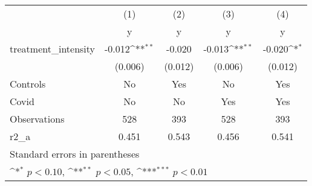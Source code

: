 {
\def\sym#1{\ifmmode^{#1}\else\(^{#1}\)\fi}
\begin{tabular}{l*{4}{c}}
\hline\hline
                    &\multicolumn{1}{c}{(1)}&\multicolumn{1}{c}{(2)}&\multicolumn{1}{c}{(3)}&\multicolumn{1}{c}{(4)}\\
                    &\multicolumn{1}{c}{y}&\multicolumn{1}{c}{y}&\multicolumn{1}{c}{y}&\multicolumn{1}{c}{y}\\
\hline
treatment\_intensity &      -0.012\sym{**} &      -0.020         &      -0.013\sym{**} &      -0.020\sym{*}  \\
                    &     (0.006)         &     (0.012)         &     (0.006)         &     (0.012)         \\
[1em]
Controls            &          No         &         Yes         &          No         &         Yes         \\
[1em]
Covid               &          No         &          No         &         Yes         &         Yes         \\
\hline
Observations        &         528         &         393         &         528         &         393         \\
r2\_a                &       0.451         &       0.543         &       0.456         &       0.541         \\
\hline\hline
\multicolumn{5}{l}{\footnotesize Standard errors in parentheses}\\
\multicolumn{5}{l}{\footnotesize \sym{*} \(p<0.10\), \sym{**} \(p<0.05\), \sym{***} \(p<0.01\)}\\
\end{tabular}
}
